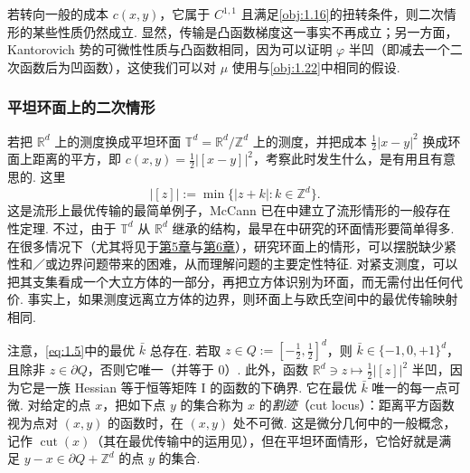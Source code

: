 \begin{remark}\label{obj:1.24}
若转向一般的成本 $c(x,y)$，它属于 $C^{1,1}$ 且满足\autoref{obj:1.16}的扭转条件，则二次情形的某些性质仍然成立. 显然，传输是凸函数梯度这一事实不再成立；另一方面，Kantorovich 势的可微性性质与凸函数相同，因为可以证明 $\varphi$ 半凹（即减去一个二次函数后为凹函数），这使我们可以对 $\mu$ 使用与\autoref{obj:1.22}中相同的假设.
\end{remark}

\subsubsection{平坦环面上的二次情形}\label{sec:1.3.2}

若把 $\mathbb R^d$ 上的测度换成平坦环面 $\mathbb T^d=\mathbb R^d/\mathbb Z^d$ 上的测度，并把成本 $\frac12|x-y|^2$ 换成环面上距离的平方，即 $c(x,y)=\frac12|[x-y]|^2$，考察此时发生什么，是有用且有意思的. 这里
\begin{equation}\label{eq:1.5}
|[z]|:=\min\{|z+k|:k\in\mathbb Z^d\}.
\end{equation}
这是流形上最优传输的最简单例子，McCann 已在\cite{b231}中建立了流形情形的一般存在性定理. 不过，由于 $\mathbb T^d$ 从 $\mathbb R^d$ 继承的结构，最早在\cite{b127}中研究的环面情形要简单得多. 在很多情况下（尤其将见于\hyperref[sec:5]{第5章}与\hyperref[sec:6]{第6章}），研究环面上的情形，可以摆脱缺少紧性和／或边界问题带来的困难，从而理解问题的主要定性特征. 对紧支测度，可以把其支集看成一个大立方体的一部分，再把立方体识别为环面，而无需付出任何代价. 事实上，如果测度远离立方体的边界，则环面上与欧氏空间中的最优传输映射相同.

\label{idx:i137-p19}
\label{idx:i34-p19}
注意，\eqref{eq:1.5}中的最优 $\bar k$ 总存在. 若取 $z\in Q:=[-\frac12,\frac12]^d$，则 $\bar k\in\{-1,0,+1\}^d$，且除非 $z\in\partial Q$，否则它唯一（并等于 $0$）. 此外，函数 $\mathbb R^d\ni z\mapsto\frac12|[z]|^2$ 半凹，因为它是一族 Hessian 等于恒等矩阵 $\mathrm I$ 的函数的下确界. 它在最优 $\bar k$ 唯一的每一点可微. 对给定的点 $x$，把如下点 $y$ 的集合称为 $x$ 的\emph{割迹}（cut locus）：距离平方函数视为点对 $(x,y)$ 的函数时，在 $(x,y)$ 处不可微. 这是微分几何中的一般概念，记作 $\operatorname{cut}(x)$（其在最优传输中的运用见\cite{b294}），但在平坦环面情形，它恰好就是满足 $y-x\in\partial Q+\mathbb Z^d$ 的点 $y$ 的集合.

